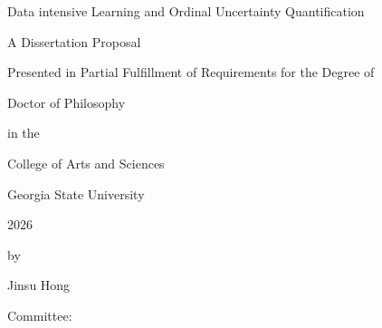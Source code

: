 \documentclass[12pt]{report}
\newcommand{\ProposalTitle}{
Data intensive Learning and Ordinal Uncertainty Quantification
}
\newcommand{\StudentName}{Jinsu Hong}
\newcommand{\ProposalYear}{2026}
\begin{document}

\begin{titlepage}
    \singlespacing
    \thispagestyle{empty}
    \enlargethispage{0.3in}
    
    \centering

    \vspace*{0.10in}

    {\Large \ProposalTitle \par}

    \vspace{0.25in}

    A Dissertation Proposal

    \vspace{0.32in}

    Presented in Partial Fulfillment of Requirements for the Degree of

    \vspace{0.12in}

    Doctor of Philosophy

    \vspace{0.28in}

    in the

    \vspace{0.28in}

    College of Arts and Sciences

    \vspace{0.28in}

    Georgia State University

    \vspace{0.28in}

    \ProposalYear

    \vspace{0.28in}

    by

    \vspace{0.22in}

    \StudentName


    \vspace{0.35in}

    Committee:

    \vspace{0.18in}


\end{titlepage}
\end{document}
